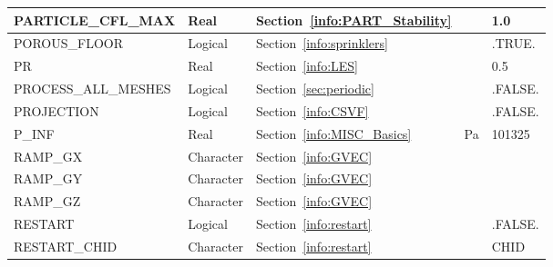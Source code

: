 \documentclass[11pt]{book}
\begin{document}
\begin{longtable}{@{\extracolsep{\fill}}|l|l|l|l|l|}
{\ct PARTICLE\_CFL\_MAX}                        & Real          & Section~\ref{info:PART_Stability}                     &               & 1.0               \\ \hline
{\ct POROUS\_FLOOR}                             & Logical       & Section~\ref{info:sprinklers}                         &               & {\ct .TRUE.}      \\ \hline
{\ct PR}                                        & Real          & Section~\ref{info:LES}                                &               & 0.5               \\ \hline
{\ct PROCESS\_ALL\_MESHES}                      & Logical       & Section~\ref{sec:periodic}                            &               & {\ct .FALSE.}     \\ \hline
{\ct PROJECTION}                                & Logical       & Section~\ref{info:CSVF}                               &               & {\ct .FALSE.}     \\ \hline
{\ct P\_INF}                                    & Real          & Section~\ref{info:MISC_Basics}                        & Pa            & 101325            \\ \hline
{\ct RAMP\_GX}                                  & Character     & Section~\ref{info:GVEC}                               &               &                   \\ \hline
{\ct RAMP\_GY}                                  & Character     & Section~\ref{info:GVEC}                               &               &                   \\ \hline
{\ct RAMP\_GZ}                                  & Character     & Section~\ref{info:GVEC}                               &               &                   \\ \hline
{\ct RESTART}                                   & Logical       & Section~\ref{info:restart}                            &               & {\ct .FALSE.}     \\ \hline
{\ct RESTART\_CHID}                             & Character     & Section~\ref{info:restart}                            &               & {\ct CHID}        \\ \hline

\end{longtable}
\end{document}
